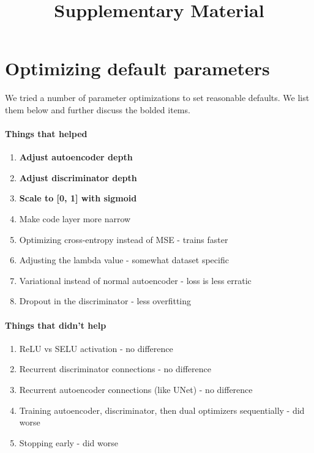 \documentclass{article}
\begin{document}
\title{Supplementary Material}
\date{\vspace{-5ex}}

\maketitle

\doublespacing

\section{Optimizing default parameters}

We tried a number of parameter optimizations to set reasonable defaults.
We list them below and further discuss the bolded items.

\paragraph{Things that helped}

\begin{enumerate}
	\item \textbf{Adjust autoencoder depth}
	\item \textbf{Adjust discriminator depth}
	\item \textbf{Scale to [0, 1] with sigmoid}
	\item Make code layer more narrow
	\item Optimizing cross-entropy instead of MSE - trains faster
	\item Adjusting the lambda value - somewhat dataset specific
	\item Variational instead of normal autoencoder - loss is less erratic
	\item Dropout in the discriminator - less overfitting
\end{enumerate}

\paragraph{Things that didn't help}

\begin{enumerate}
	\item ReLU vs SELU \cite{klambauer_self-normalizing_2017} activation - no difference
	\item Recurrent discriminator connections - no difference
	\item Recurrent autoencoder connections (like UNet) - no difference
	\item Training autoencoder, discriminator, then dual optimizers sequentially - did worse
	\item Stopping early - did worse
\end{enumerate}
\end{document}
